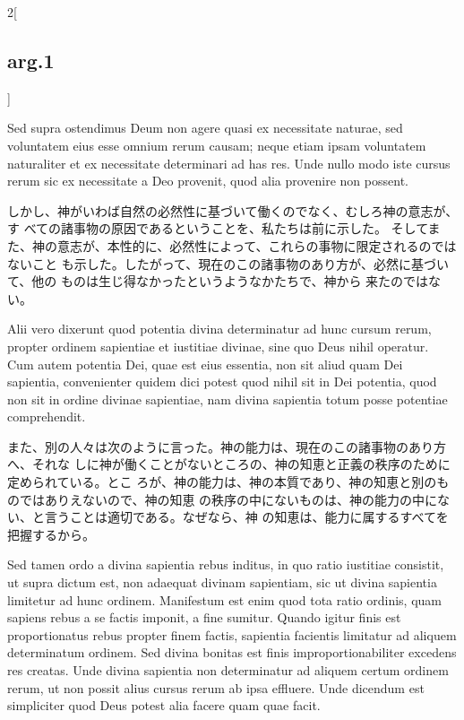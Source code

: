 \documentclass[paper=a4paper,fontsize=10pt,jafontsize=9pt,titlepage]{jlreq}
\begin{document}
\begin{paracol}{2}[\subsection{arg.1}]
\switchcolumn*

Sed supra ostendimus
Deum non agere quasi ex necessitate naturae, sed voluntatem eius esse
omnium rerum causam; neque etiam ipsam voluntatem naturaliter et ex
necessitate determinari ad has res. Unde nullo modo iste cursus rerum
sic ex necessitate a Deo provenit, quod alia provenire non possent.

\switchcolumn

しかし、神がいわば自然の必然性に基づいて働くのでなく、むしろ神の意志が、す
 べての諸事物の原因であるということを、私たちは前に示した。
そしてまた、神の意志が、本性的に、必然性によって、これらの事物に限定されるのではないこと
 も示した。したがって、現在のこの諸事物のあり方が、必然に基づいて、他の
 ものは生じ得なかったというようなかたちで、神から
 来たのではない。

\switchcolumn*

Alii
vero dixerunt quod potentia divina determinatur ad hunc cursum rerum,
propter ordinem sapientiae et iustitiae divinae, sine quo Deus nihil
operatur. Cum autem potentia Dei, quae est eius essentia, non sit aliud
quam Dei sapientia, convenienter quidem dici potest quod nihil sit in
Dei potentia, quod non sit in ordine divinae sapientiae, nam divina
sapientia totum posse potentiae comprehendit.

\switchcolumn

また、別の人々は次のように言った。神の能力は、現在のこの諸事物のあり方へ、それな
しに神が働くことがないところの、神の知恵と正義の秩序のために定められている。とこ
ろが、神の能力は、神の本質であり、神の知恵と別のものではありえないので、神の知恵
の秩序の中にないものは、神の能力の中にない、と言うことは適切である。なぜなら、神
の知恵は、能力に属するすべてを把握するから。

\switchcolumn*

Sed tamen ordo a divina sapientia rebus inditus, in quo ratio iustitiae
consistit, ut supra dictum est, non adaequat divinam sapientiam, sic ut divina
sapientia limitetur ad hunc ordinem. Manifestum est enim quod tota ratio
ordinis, quam sapiens rebus a se factis imponit, a fine sumitur.  Quando igitur
finis est proportionatus rebus propter finem factis, sapientia facientis
limitatur ad aliquem determinatum ordinem. Sed divina bonitas est finis
improportionabiliter excedens res creatas. Unde divina sapientia non
determinatur ad aliquem certum ordinem rerum, ut non possit alius cursus rerum
ab ipsa effluere. Unde dicendum est simpliciter quod Deus potest alia facere
quam quae facit.


\end{paracol}
\end{document}
